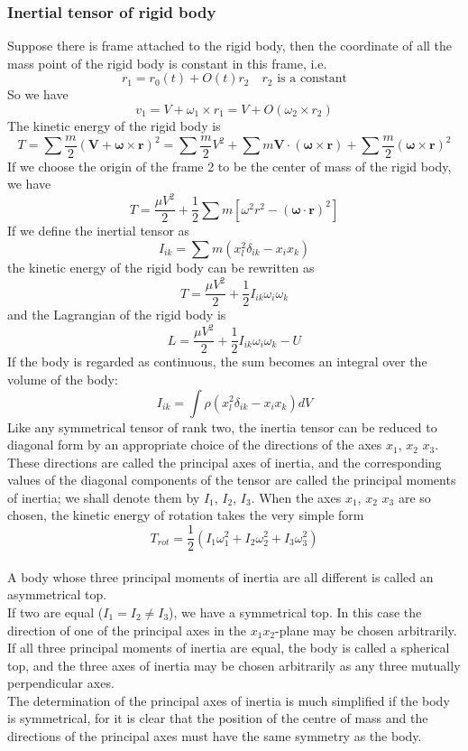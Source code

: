 \documentclass[cyan]{elegantnote}
\begin{document}
\subsubsection{Inertial tensor of rigid body}
Suppose there is frame attached to the rigid body, then the coordinate of all the mass point of the rigid body is constant in this frame, i.e.
\[r_1 = r_0(t) + O(t)r_2 \quad r_2 \mbox{ is a constant}\]
So we have
\[v_1 = V + \omega_1 \times r_1 = V + O(\omega_2 \times r_2)\]
The kinetic energy of the rigid body is
\[T = \sum \frac{m}{2} (\bm{V} + \bm{\omega} \times \bm{r})^2 = \sum \frac{m}{2} V^2 + \sum m\bm{V}\cdot(\bm{\omega}\times\bm{r}) + \sum \frac{m}{2} (\bm{\omega} \times \bm{r})^2\]
If we choose the origin of the frame 2 to be the center of mass of the rigid body, we have
\[T = \frac{\mu V^2}{2} + \frac{1}{2}\sum m [\omega^2r^2-(\bm{\omega} \cdot \bm{r})^2]\]
If we define the inertial tensor as
\[I_{ik} = \sum m (x_l^2 \delta_{ik} - x_i x_k)\]
the kinetic energy of the rigid body can be rewritten as
\[T = \frac{\mu V^2}{2} + \frac{1}{2} I_{ik}\omega_i \omega_k\]
and the Lagrangian of the rigid body is
\[L = \frac{\mu V^2}{2} + \frac{1}{2} I_{ik}\omega_i \omega_k -U\]
If the body is regarded as continuous, the sum becomes an integral over the volume of the body:
\[I_{ik} = \int \rho (x_l^2 \delta_{ik} - x_i x_k) dV\]
Like any symmetrical tensor of rank two, the inertia tensor can be reduced to diagonal form by an appropriate choice of the directions of the axes $x_1$, $x_2$ $x_3$. 
These directions are called the principal axes of inertia, and the corresponding values of the diagonal components of the tensor are called the principal moments of inertia; we shall denote them by $I_1$, $I_2$, $I_3$. 
When the axes $x_1$, $x_2$ $x_3$ are so chosen, the kinetic energy of rotation takes the very simple form
\[T_{rot} = \frac{1}{2} (I_1 \omega_1^2 + I_2 \omega_2^2 + I_3 \omega_3^2)\]\\
A body whose three principal moments of inertia are all different is called an asymmetrical top. \\
If two are equal ($I_1 = I_2 \neq I_3$), we have a symmetrical top. 
In this case the direction of one of the principal axes in the $x_1x_2$-plane may be chosen arbitrarily. \\
If all three principal moments of inertia are equal, the body is called a spherical top, and the three axes of inertia may be chosen arbitrarily as any three mutually perpendicular axes.\\
The determination of the principal axes of inertia is much simplified if the body is symmetrical, for it is clear that the position of the centre of mass and the directions of the principal axes must have the same symmetry as the body. \\
\end{document}
